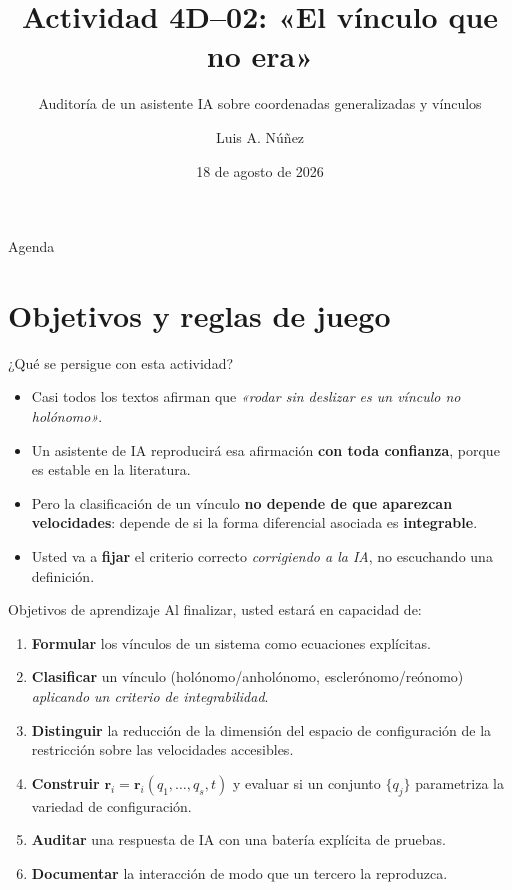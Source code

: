 \documentclass[10pt,aspectratio=169]{beamer}
\title[Actividad 4D-02: vínculos]{Actividad 4D--02: «El vínculo que no era»}
\subtitle{Auditoría de un asistente IA sobre coordenadas generalizadas y vínculos}
\author[L.A. Núñez]{Luis A. Núñez}
\institute[UIS]{Escuela de Física, Facultad de Ciencias,\\ Universidad Industrial de Santander, Santander, Colombia}
\date{18 de agosto de 2026}
\newcommand{\rv}{\mathbf{r}}
\begin{document}
\begin{frame}
  \titlepage
\end{frame}

\begin{frame}{Agenda}
  \tableofcontents
\end{frame}

\section{Objetivos y reglas de juego}

\begin{frame}{¿Qué se persigue con esta actividad?}
  \begin{itemize}[<+->]
    \item Casi todos los textos afirman que \emph{«rodar sin deslizar es un vínculo no holónomo»}.
    \item Un asistente de IA reproducirá esa afirmación \textbf{con toda confianza}, porque es estable en la literatura.
    \item Pero la clasificación de un vínculo \textbf{no depende de que aparezcan velocidades}: depende de si la forma diferencial asociada es \textbf{integrable}.
    \item Usted va a \textbf{fijar} el criterio correcto \emph{corrigiendo a la IA}, no escuchando una definición.
  \end{itemize}
\end{frame}

\begin{frame}{Objetivos de aprendizaje}
  Al finalizar, usted estará en capacidad de:
  \begin{enumerate}[<+->]
    \item \textbf{Formular} los vínculos de un sistema como ecuaciones explícitas.
    \item \textbf{Clasificar} un vínculo (holónomo/anholónomo, esclerónomo/reónomo) \emph{aplicando un criterio de integrabilidad}.
    \item \textbf{Distinguir} la reducción de la dimensión del espacio de configuración de la restricción sobre las velocidades accesibles.
    \item \textbf{Construir} $\rv_i=\rv_i(q_1,\dots,q_s,t)$ y evaluar si un conjunto $\{q_j\}$ parametriza la variedad de configuración.
    \item \textbf{Auditar} una respuesta de IA con una batería explícita de pruebas.
    \item \textbf{Documentar} la interacción de modo que un tercero la reproduzca.
  \end{enumerate}
\end{frame}
\end{document}
